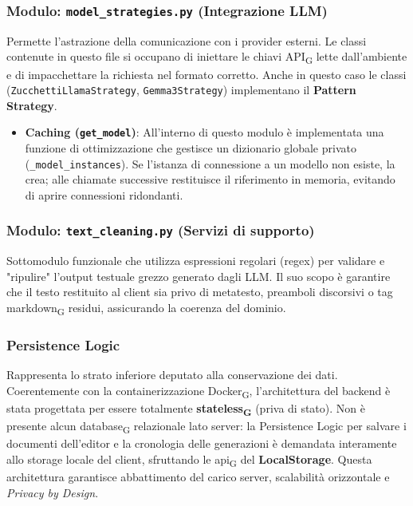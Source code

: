 \documentclass[11pt,a4paper]{article}
\newcommand{\gls}[1]{#1\textsubscript{G}}
\begin{document}
\subsubsection{Modulo: \texttt{model\_strategies.py} (Integrazione LLM)}
Permette l'astrazione della comunicazione con i provider esterni. Le classi contenute in questo file si occupano di iniettare le chiavi \gls{API} lette dall'ambiente e di impacchettare la richiesta nel formato corretto. Anche in questo caso le classi (\texttt{ZucchettiLlamaStrategy}, \texttt{Gemma3Strategy}) implementano il \textbf{Pattern Strategy}.
\begin{itemize}
    \item \textbf{Caching (\texttt{get\_model})}: All'interno di questo modulo è implementata una funzione di ottimizzazione che gestisce un dizionario globale privato (\texttt{\_model\_instances}). Se l'istanza di connessione a un modello non esiste, la crea; alle chiamate successive restituisce il riferimento in memoria, evitando di aprire connessioni ridondanti.
\end{itemize}


\subsubsection{Modulo: \texttt{text\_cleaning.py} (Servizi di supporto)}
Sottomodulo funzionale che utilizza espressioni regolari (regex) per validare e "ripulire" l'output testuale grezzo generato dagli LLM. Il suo scopo è garantire che il testo restituito al client sia privo di metatesto, preamboli discorsivi o tag \gls{markdown} residui, assicurando la coerenza del dominio.


\subsubsection{Persistence Logic}
Rappresenta lo strato inferiore deputato alla conservazione dei dati.  Coerentemente con la containerizzazione \gls{Docker}, l'architettura del backend è stata progettata per essere totalmente \textbf{\gls{stateless}} (priva di stato). Non è presente alcun \gls{database} relazionale lato server: la Persistence Logic per salvare i documenti dell'editor e la cronologia delle generazioni è demandata interamente allo storage locale del client, sfruttando le \gls{api} del \textbf{LocalStorage}. Questa architettura garantisce abbattimento del carico server, scalabilità orizzontale e \textit{Privacy by Design}.
\end{document}
